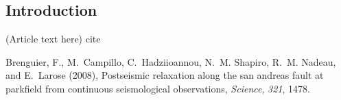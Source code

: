 \documentclass[draft,jgrga]{agutex}
\begin{document}
\title{}
\begin{abstract}

\end{abstract}
\begin{article}

\section{Introduction}
(Article text here)
cite \cite{2008o}
\begin{thebibliography}{}
Brenguier, F., M.~Campillo, C.~Hadziioannou, N.~M. Shapiro, R.~M. Nadeau, and
  E.~Larose (2008), Postseismic relaxation along the san andreas fault at
  parkfield from continuous seismological observations, \textit{Science},
  \textit{321}, 1478.
\end{thebibliography}
\end{article}
\end{document}
